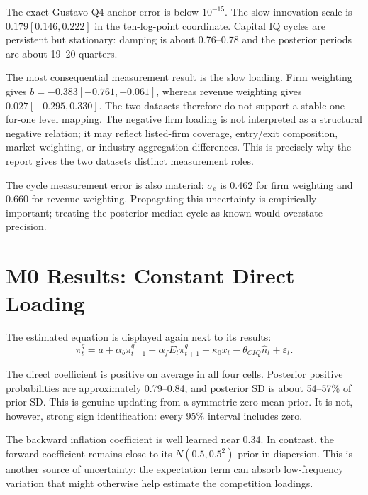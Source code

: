 \documentclass[11pt]{article}
\newcommand{\Nhat}{\hat n}
\begin{document}
The exact Gustavo Q4 anchor error is below $10^{-15}$. The slow innovation scale is
$0.179[0.146,0.222]$ in the ten-log-point coordinate. Capital IQ cycles are persistent but
stationary: damping is about 0.76--0.78 and the posterior periods are about 19--20 quarters.

The most consequential measurement result is the slow loading. Firm weighting gives
$b=-0.383[-0.761,-0.061]$, whereas revenue weighting gives
$0.027[-0.295,0.330]$. The two datasets therefore do not support a stable one-for-one level
mapping. The negative firm loading is not interpreted as a structural negative relation;
it may reflect listed-firm coverage, entry/exit composition, market weighting, or industry
aggregation differences. This is precisely why the report gives the two datasets distinct
measurement roles.

The cycle measurement error is also material: $\sigma_e$ is 0.462 for firm weighting and
0.660 for revenue weighting. Propagating this uncertainty is empirically important; treating
the posterior median cycle as known would overstate precision.

\section{M0 Results: Constant Direct Loading}

The estimated equation is displayed again next to its results:
\begin{equation}
\pi_t^q=a+\alpha_b\pi_{t-1}^q+\alpha_fE_t\pi_{t+1}^q
+\kappa_0x_t-\theta_{CIQ}\Nhat_t+\varepsilon_t.
\end{equation}

\begin{table}[H]
\centering
\caption{Constant-theta model; posterior mean and 95\% interval}
\resizebox{\linewidth}{!}{}
\end{table}

The direct coefficient is positive on average in all four cells. Posterior positive
probabilities are approximately 0.79--0.84, and posterior SD is about 54--57\% of prior SD.
This is genuine updating from a symmetric zero-mean prior. It is not, however, strong sign
identification: every 95\% interval includes zero.

The backward inflation coefficient is well learned near 0.34. In contrast, the forward
coefficient remains close to its $N(0.5,0.5^2)$ prior in dispersion. This is another source
of uncertainty: the expectation term can absorb low-frequency variation that might otherwise
help estimate the competition loadings.
\end{document}
